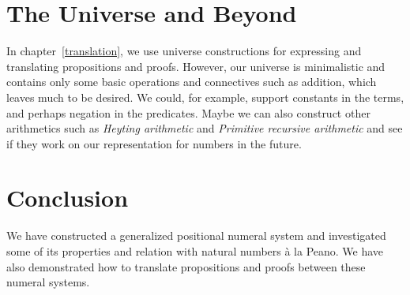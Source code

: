 \documentclass[\main/thesis.tex]{subfiles}
\begin{document}
\section{The Universe and Beyond}

In chapter~\ref{translation}, we use universe constructions for expressing and
translating propositions and proofs.
However, our universe is minimalistic and contains only some basic operations
and connectives such as addition, which leaves much to be desired.
We could, for example, support constants in the terms, and perhaps negation in
the predicates.
Maybe we can also construct other arithmetics such as
\textit{Heyting arithmetic} and \textit{Primitive recursive arithmetic}
and see if they work on our representation for numbers in the future.

\section{Conclusion}

We have constructed a generalized positional numeral system
and investigated some of its properties and relation with natural numbers à la
Peano.
We have also demonstrated how to translate propositions and proofs between these
numeral systems.
\end{document}
